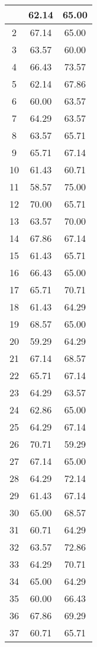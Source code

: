 \documentclass[11pt]{article}
\begin{document}
\begin{longtable}[c]{| c | c |c |}
 \hline
 \hline\hline
 \endlastfoot
1 & 62.14 & 65.00 \\ \hline
2 & 67.14 & 65.00 \\ \hline
3 & 63.57 & 60.00 \\ \hline
4 & 66.43 & 73.57 \\ \hline
5 & 62.14 & 67.86 \\ \hline
6 & 60.00 & 63.57 \\ \hline
7 & 64.29 & 63.57 \\ \hline
8 & 63.57 & 65.71 \\ \hline
9 & 65.71 & 67.14 \\ \hline
10 & 61.43 & 60.71 \\ \hline
11 & 58.57 & 75.00 \\ \hline
12 & 70.00 & 65.71 \\ \hline
13 & 63.57 & 70.00 \\ \hline
14 & 67.86 & 67.14 \\ \hline
15 & 61.43 & 65.71 \\ \hline
16 & 66.43 & 65.00 \\ \hline
17 & 65.71 & 70.71 \\ \hline
18 & 61.43 & 64.29 \\ \hline
19 & 68.57 & 65.00 \\ \hline
20 & 59.29 & 64.29 \\ \hline
21 & 67.14 & 68.57 \\ \hline
22 & 65.71 & 67.14 \\ \hline
23 & 64.29 & 63.57 \\ \hline
24 & 62.86 & 65.00 \\ \hline
25 & 64.29 & 67.14 \\ \hline
26 & 70.71 & 59.29 \\ \hline
27 & 67.14 & 65.00 \\ \hline
28 & 64.29 & 72.14 \\ \hline
29 & 61.43 & 67.14 \\ \hline
30 & 65.00 & 68.57 \\ \hline
31 & 60.71 & 64.29 \\ \hline
32 & 63.57 & 72.86 \\ \hline
33 & 64.29 & 70.71 \\ \hline
34 & 65.00 & 64.29 \\ \hline
35 & 60.00 & 66.43 \\ \hline
36 & 67.86 & 69.29 \\ \hline
37 & 60.71 & 65.71 \\ \hline

\end{longtable}
\end{document}

